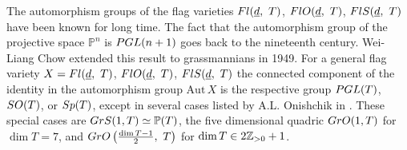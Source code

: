 \documentclass[11pt, a4paper]{article}
\begin{document}
The automorphism groups of the flag varieties $Fl(\underline{d},~T)$, $FlO(\underline{d},~T)$, $FlS(\underline{d},~T)$ have been known for long time. The fact that the automorphism group of the projective space $\mathbb{P}^n$ is $PGL (n+1)$ goes back to the nineteenth century. Wei-Liang Chow \cite{Chow} extended this result to grassmannians in 1949. %
For a general flag variety $X=Fl(\underline{d},~T)$, $FlO(\underline{d},~T)$, $FlS(\underline{d},~T)$ %
the connected component of the identity in the automorphism group $\mathrm{Aut}\,X$ is the respective group $PGL (T)$, $SO (T)$, or $Sp (T)$, except in several cases listed by A.L. Onishchik in \cite{Onishchik}. These special cases are %
$GrS(1,T)\simeq\mathbb{P}(T)$, the five dimensional quadric $GrO(1,T)$ for $\dim T=7$, and $GrO \left(\frac{\dim T -1}{2},~T\right)$ for $\dim T\in 2\mathbb{Z}_{>0}+1$. %
\end{document}
